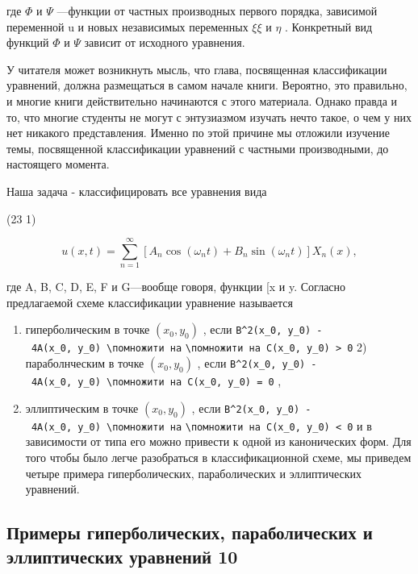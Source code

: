 \documentclass[
  ukrainian,
]{article}
\begin{document}
где \(\Phi\) и \(\Psi\) ---функции от частных производных первого
порядка, зависимой переменной u и новых независимых переменных
\(\xi \xi\) и \(\eta\) . Конкретный вид функций \(\Phi\) и \(\Psi\)
зависит от исходного уравнения.

У читателя может возникнуть мысль, что глава, посвященная классификации
уравнений, должна размещаться в самом начале книги. Вероятно, это
правильно, и многие книги действительно начинаются с этого материала.
Однако правда и то, что многие студенты не могут с энтузиазмом изучать
нечто такое, о чем у них нет никакого представления. Именно по этой
причине мы отложили изучение темы, посвященной классификации уравнений с
частными производными, до настоящего момента.

Наша задача - классифицировать все уравнения вида

(23 1)

\[
u(x,t) = \sum_{n=1}^{\infty} \left[
A_n \cos(\omega_n t) + B_n \sin(\omega_n t)
\right] X_n(x),
\]

где A, B, C, D, E, F и G---вообще говоря, функции {[}x и y. Согласно
предлагаемой схеме классификации уравнение называется

\begin{enumerate}
\def\labelenumi{\arabic{enumi})}
\item
  гиперболическим в точке \((x_0, y_0)\) , если
  \texttt{B\^{}2(x\_0,\ y\_0)\ -\ 4A(x\_0,\ y\_0)\ \textbackslash{}помножити\ на}
  \texttt{\textbackslash{}помножити\ на\ C(x\_0,\ y\_0)\ \textgreater{}\ 0}
  2) параболнческим в точке \((x_0, y_0)\) , если
  \texttt{B\^{}2(x\_0,\ y\_0)\ -\ 4A(x\_0,\ y\_0)\ \textbackslash{}помножити\ на\ C(x\_0,\ y\_0)\ =\ 0}
  ,
\item
  эллиптическим в точке \((x_0, y_0)\) , если
  \texttt{B\^{}2(x\_0,\ y\_0)\ -\ 4A(x\_0,\ y\_0)\ \textbackslash{}помножити\ на}
  \texttt{\textbackslash{}помножити\ на\ C(x\_0,\ y\_0)\ \textless{}\ 0}
  и в зависимости от типа его можно привести к одной из канонических
  форм. Для того чтобы было легче разобраться в классификационной схеме,
  мы приведем четыре примера гиперболических, параболических и
  эллиптических уравнений.
\end{enumerate}

\subsection{Примеры гиперболических, параболических и эллиптических
уравнений
10}\label{ux43fux440ux438ux43cux435ux440ux44b-ux433ux438ux43fux435ux440ux431ux43eux43bux438ux447ux435ux441ux43aux438ux445-ux43fux430ux440ux430ux431ux43eux43bux438ux447ux435ux441ux43aux438ux445-ux438-ux44dux43bux43bux438ux43fux442ux438ux447ux435ux441ux43aux438ux445-ux443ux440ux430ux432ux43dux435ux43dux438ux439-10-1}
\end{document}
